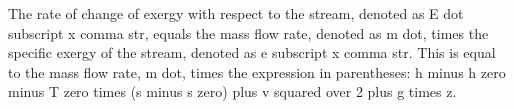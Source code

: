 The rate of change of exergy with respect to the stream, denoted as E dot subscript x comma str, equals the mass flow rate, denoted as m dot, times the specific exergy of the stream, denoted as e subscript x comma str. This is equal to the mass flow rate, m dot, times the expression in parentheses: h minus h zero minus T zero times (s minus s zero) plus v squared over 2 plus g times z.